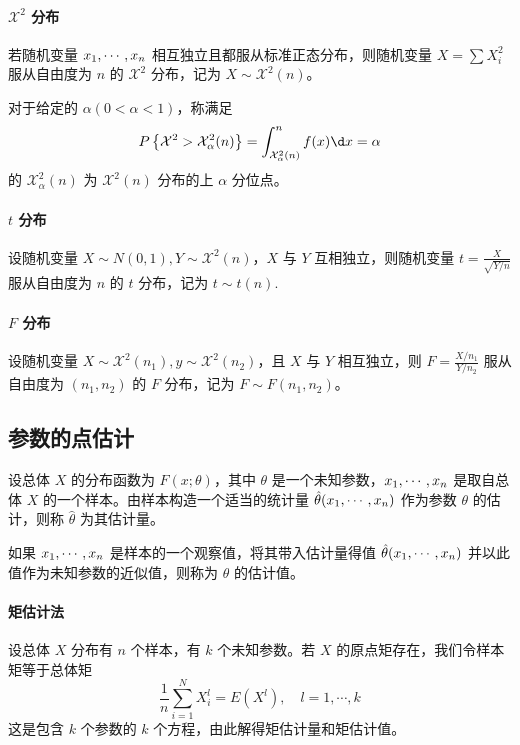 \newcommand{\calX}{\mathcal{X}}

\paragraph{$\calX^2$ 分布}

若随机变量 $x_1,\cdots,x_n$ 相互独立且都服从标准正态分布，则随机变量 $X = \sum X_i^2$ 服从自由度为 $n$ 的 $\calX^2$ 分布，记为 $X \sim \calX^2(n)$。

对于给定的 $\alpha(0 < \alpha < 1)$，称满足
\[ P\left\{\calX^2 > \calX_\alpha^2(n)\right\} = \int_{\calX_\alpha^2(n)}^n f(x) \d x = \alpha  \]
的 $\calX_\alpha^2(n)$ 为 $\calX^2(n)$ 分布的上 $\alpha$ 分位点。

\paragraph{$t$ 分布}

设随机变量 $X \sim N(0, 1), Y \sim \calX^2(n)$，$X$ 与 $Y$ 互相独立，则随机变量 $t = \frac{X}{\sqrt{Y / n}}$ 服从自由度为 $n$ 的 $t$ 分布，记为 $t \sim t(n)$.

\paragraph{$F$ 分布}

设随机变量 $X \sim \calX^2(n_1), y \sim \calX^2(n_2)$，且 $X$ 与 $Y$ 相互独立，则 $F = \frac{X / n_1}{Y / n_2}$ 服从自由度为 $(n_1, n_2)$ 的 $F$ 分布，记为 $F \sim F(n_1, n_2)$。

\subsection{参数的点估计}

设总体 $X$ 的分布函数为 $F(x; \theta)$，其中 $\theta$ 是一个未知参数，$x_1,\cdots,x_n$ 是取自总体 $X$ 的一个样本。由样本构造一个适当的统计量 $\hat{\theta}(x_1,\cdots,x_n)$ 作为参数 $\theta$ 的估计，则称 $\hat{\theta}$ 为其估计量。

如果 $x_1,\cdots,x_n$ 是样本的一个观察值，将其带入估计量得值 $\hat{\theta}(x_1,\cdots,x_n)$ 并以此值作为未知参数的近似值，则称为 $\theta$ 的估计值。

\paragraph{矩估计法}

设总体 $X$ 分布有 $n$ 个样本，有 $k$ 个未知参数。若 $X$ 的原点矩存在，我们令样本矩等于总体矩
\[ \frac{1}{n} \sum_{i=1}^{N} X_i^l = E(X^l), \quad l = 1, \cdots, k \]
这是包含 $k$ 个参数的 $k$ 个方程，由此解得矩估计量和矩估计值。

